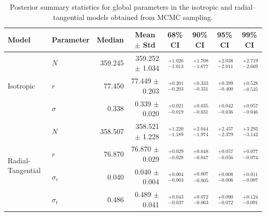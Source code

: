 \documentclass[11pt]{article}
\begin{document}
\begin{table}[ht]
\centering
\caption{Posterior summary statistics for global parameters in the isotropic and radial–tangential models obtained from MCMC sampling.}
\begin{tabular}{llrrrrrr}
\toprule
Model & Parameter & \multicolumn{1}{c}{Median} & \multicolumn{1}{c}{Mean $\pm$ Std} & \multicolumn{1}{c}{68\% CI} & \multicolumn{1}{c}{90\% CI} & \multicolumn{1}{c}{95\% CI} & \multicolumn{1}{c}{99\% CI} \\
\midrule
\multirow{3}{*}{Isotropic} & $N$ & 359.245 & 359.252 $\pm$ 1.034 & $^{+1.026}_{-1.013}$ & $^{+1.708}_{-1.677}$ & $^{+2.038}_{-2.011}$ & $^{+2.719}_{-2.669}$ \\
 & $r$ & 77.450 & 77.449 $\pm$ 0.203 & $^{+0.201}_{-0.203}$ & $^{+0.333}_{-0.331}$ & $^{+0.399}_{-0.400}$ & $^{+0.528}_{-0.535}$ \\
 & $\sigma$ & 0.338 & 0.339 $\pm$ 0.020 & $^{+0.021}_{-0.019}$ & $^{+0.035}_{-0.031}$ & $^{+0.042}_{-0.036}$ & $^{+0.057}_{-0.046}$ \\
\midrule
\multirow{4}{*}{Radial-Tangential} & $N$ & 358.507 & 358.521 $\pm$ 1.228 & $^{+1.220}_{-1.189}$ & $^{+2.044}_{-1.974}$ & $^{+2.457}_{-2.379}$ & $^{+3.293}_{-3.142}$ \\
 & $r$ & 76.870 & 76.870 $\pm$ 0.029 & $^{+0.029}_{-0.028}$ & $^{+0.048}_{-0.047}$ & $^{+0.057}_{-0.056}$ & $^{+0.077}_{-0.074}$ \\
 & $\sigma_r$ & 0.040 & 0.040 $\pm$ 0.004 & $^{+0.004}_{-0.003}$ & $^{+0.007}_{-0.005}$ & $^{+0.008}_{-0.006}$ & $^{+0.011}_{-0.007}$ \\
 & $\sigma_t$ & 0.486 & 0.489 $\pm$ 0.041 & $^{+0.043}_{-0.037}$ & $^{+0.072}_{-0.063}$ & $^{+0.090}_{-0.072}$ & $^{+0.124}_{-0.091}$ \\
\bottomrule
\end{tabular}
\label{tab:mcmc-1}
\end{table}
\end{document}

